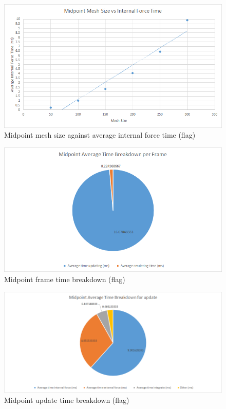     \begin{figure}
    \begin{center}
      \includegraphics[scale=.9]{Figures/flag_m_m_csf}
    \end{center}
    \caption{Midpoint mesh size against average internal force time (flag)}
    \label{fig:m mesh csf flag}
  \end{figure}
  
    \begin{figure}
    \begin{center}
      \includegraphics[scale=.9]{Figures/flag_m_ft}
    \end{center}
    \caption{Midpoint frame time breakdown (flag)}
    \label{fig:m ft flag}
  \end{figure}
  
    \begin{figure}
    \begin{center}
      \includegraphics[scale=.9]{Figures/flag_m_ut}
    \end{center}
    \caption{Midpoint update time breakdown (flag)}
    \label{fig:m ut flag}
  \end{figure}

